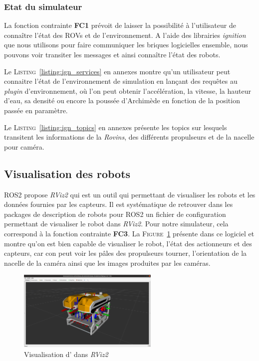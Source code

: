 		\subsubsection{Etat du simulateur}

			La fonction contrainte \textbf{FC1} prévoit de laisser la possibilité à l'utilisateur de connaître l'état des \gls{ROV}s et de l'environnement. A l'aide des librairies \textit{ignition} que nous utilisons pour faire communiquer les briques logicielles ensemble, nous pouvons voir transiter les messages et ainsi connaître l'état des robots.

			Le \textsc{Listing}~\ref{listing:ign_services} en annexes montre qu'un utilisateur peut connaitre l'état de l'environnement de simulation en lançant des requêtes au \textit{plugin} d'environnement, où l'on peut obtenir l'accélération, la vitesse, la hauteur d'eau, sa densité ou encore la poussée d'Archimède en fonction de la position passée en paramètre.
			
			Le \textsc{Listing}~\ref{listing:ign_topics} en annexes présente les topics sur lesquels transitent les informations de la \textit{Rovins}, des différents propulseurs et de la nacelle pour caméra.

		\subsection{Visualisation des robots}

			\gls{ROS2} propose \textit{RViz2} qui est un outil qui permettant de visualiser les robots et les données fournies par les capteurs. Il est systématique de retrouver dans les packages de description de robots pour \gls{ROS2} un fichier de configuration permettant de visualiser le robot dans \textit{RViz2}. Pour notre simulateur, cela correspond à la fonction contrainte \textbf{FC3}. La \textsc{Figure}~\ref{fig:argos_rviz} présente \argos{} dans ce logiciel et montre qu'on est bien capable de visualiser le robot, l'état des actionneurs et des capteurs, car con peut voir les pâles des propulseurs tourner, l'orientation de la nacelle de la caméra ainsi que les images produites par les caméras.

			\begin{figure}[!htb]
				\centering
				\includegraphics[width=0.6\textwidth]{imgs/argos_rviz.png}
				\caption{Visualisation d'\argos{} dans \textit{RViz2}}
				\label{fig:argos_rviz}
			\end{figure}

